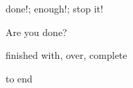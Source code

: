 \documentclass[avery5371,grid,frame]{flashcards}
\begin{document}
\cardfrontfoot{}
\begin{flashcard}{\LARGE done!; enough!; stop it!}
\LARGE {}
\end{flashcard}
\cardfrontfoot{}
\begin{flashcard}{\LARGE Are you done?}
\LARGE {}
\end{flashcard}
\cardfrontfoot{}
\begin{flashcard}{\LARGE finished with, over, complete}
\LARGE {}
\end{flashcard}
\cardfrontfoot{}
\begin{flashcard}{\LARGE to end}
\LARGE {}
\end{flashcard}
\end{document}
